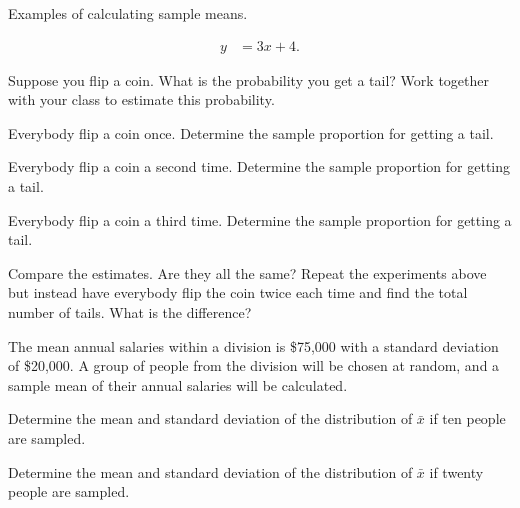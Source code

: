 

\begin{problem}
\item Examples of calculating sample means.

  \begin{subproblem}
  \item 
    \begin{eqnarray}
      y & = 3x + 4.
    \end{eqnarray}
    \vfill
  \end{subproblem}


\end{problem}



\begin{problem}
  \item Suppose you flip a coin. What is the probability you get a
    tail? Work together with your class to estimate this probability.
    \begin{subproblem}
    \item Everybody flip a coin once. Determine the sample proportion
      for getting a tail.
      \vfill
    \item Everybody flip a coin a second time. Determine the sample proportion
      for getting a tail.
      \vfill
    \item Everybody flip a coin a third time. Determine the sample proportion
      for getting a tail.
      \vfill
    \item Compare the estimates. Are they all the same? Repeat the
      experiments above but instead have everybody flip the coin twice
      each time and find the total number of tails. What is the
      difference?  
      \vspace{3em}
    \end{subproblem}
    \clearpage

  \item The mean annual salaries within a division is \$75,000 with a
    standard deviation of \$20,000. A group of people from the
    division will be chosen at random, and a sample mean of their
    annual salaries will be calculated.
  \begin{subproblem}
    \item Determine the mean and standard deviation of the
      distribution of $\bar{x}$ if ten people are sampled.

      \vfill

    \item Determine the mean and standard deviation of the
      distribution of $\bar{x}$ if twenty  people are sampled.


\end{subproblem}
\end{problem}
